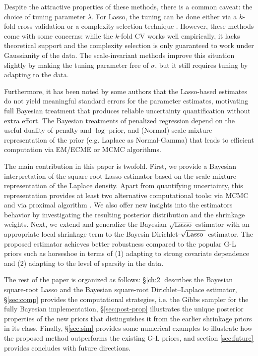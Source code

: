 \documentclass[10pt]{article}
\def\sql{$\sqrt{\text{Lasso}}$}
\def\sqdl{Dirichlet-$\sqrt{\text{\rm{Lasso} }}$}
\begin{document}
Despite the attractive properties of these methods, there is a common caveat: the choice of tuning parameter $\lambda$. For Lasso, the tuning can be done either via a $k$-fold cross-validation or a complexity selection technique \citep{giraud2012high}. However, these methods come with some concerns: while the $k$-fold CV works well empirically, it lacks theoretical support and the complexity selection is only guaranteed to work under Gaussianity of the data. The scale-invariant methods improve this situation slightly by making the tuning parameter free of $\sigma$, but it still requires tuning by adapting to the data. 

Furthermore, it has been noted by some authors \citep{chatterjee2011bootstrap} that the Lasso-based estimates do not yield meaningful standard errors for the parameter estimates, motivating full Bayesian treatment that produces reliable uncertainty quantification without extra effort. The Bayesian treatments of penalized regression depend on the useful duality of penalty and $\log$-prior, and (Normal) scale mixture representation of the prior (e.g. Laplace as Normal-Gamma) that leads to efficient computation via EM/ECME or MCMC algorithms. 

The main contribution in this paper is twofold. First, we provide a Bayesian interpretation of the square-root Lasso estimator based on the scale mixture representation of the Laplace density. Apart from quantifying uncertainty, this representation provides at least two alternative computational tools: via MCMC and via proximal algorithm \citep{polson2015proximal}. We also offer new insights into the estimators behavior by investigating the resulting posterior distribution and the shrinkage weights. Next, we extend and generalize the Bayesian \sql{} estimator with an appropriate local shrinkage term to the Bayesin \sqdl{} estimator. The proposed estimator achieves better robustness compared to the popular G-L priors such as horseshoe in terms of (1) adapting to strong covariate dependence and (2) adapting to the level of sparsity in the data. 

The rest of the paper is organized as follows: \S \ref{ch:2} describes the Bayesian square-root Lasso and the Bayesian square-root Dirichlet--Laplace estimator, \S \ref{sec:comp} provides the computational strategies, i.e. the Gibbs sampler for the fully Bayesian implementation, \S \ref{sec:post-prop} illustrates the unique posterior properties of the new priors that distinguishes it from the earlier shrinkage priors in its class. Finally, \S \ref{sec:sim} provides some numerical examples to illustrate how the proposed method outperforms the existing G-L priors, and section \ref{sec:future} provides concludes with future directions.  
\end{document}
